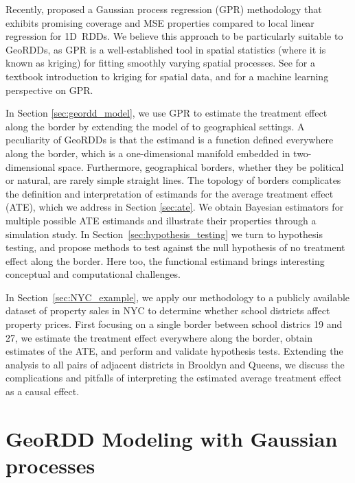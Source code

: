 \documentclass[letter,12pt]{article}
\begin{document}
Recently, \cite{Branson:2017qy} proposed a Gaussian process regression (GPR) methodology that exhibits promising coverage and MSE properties compared to local linear regression for 1D~RDDs.
We believe this approach to be particularly suitable to GeoRDDs, as GPR is a well-established tool in spatial statistics (where it is known as kriging) for fitting smoothly varying spatial processes.
See \cite{banerjee2014hierarchical} for a textbook introduction to kriging for spatial data, and \cite{rasmussen2006gaussian} for a machine learning perspective on GPR.



In Section \ref{sec:geordd_model}, we use GPR to estimate the treatment effect along the border by extending the model of \cite{Branson:2017qy} to geographical settings.
A peculiarity of GeoRDDs is that the estimand is a function defined everywhere along the border, which is a one-dimensional manifold embedded in two-dimensional space.
Furthermore, geographical borders, whether they be political or natural, are rarely simple straight lines.
The topology of borders complicates the definition and interpretation of estimands for the average treatment effect (ATE), which we address in Section \ref{sec:ate}.
We obtain Bayesian estimators for multiple possible ATE estimands and illustrate their properties through a simulation study.
In Section~\ref{sec:hypothesis_testing} we turn to hypothesis testing, and propose methods to test against the null hypothesis of no treatment effect along the border.
Here too, the functional estimand brings interesting conceptual and computational challenges.



In Section~\ref{sec:NYC_example}, we apply our methodology to a publicly available dataset of property sales in NYC to determine whether school districts affect property prices.
First focusing on a single border between school districs 19 and 27, we estimate the treatment effect everywhere along the border, obtain estimates of the ATE, and perform and validate hypothesis tests.
Extending the analysis to all pairs of adjacent districts in Brooklyn and Queens, we discuss the complications and pitfalls of interpreting the estimated average treatment effect as a causal effect.



\hypertarget{geordd-modeling-with-gaussian-processes}{%
\section{GeoRDD Modeling with Gaussian processes}\label{geordd-modeling-with-gaussian-processes}}
\end{document}

